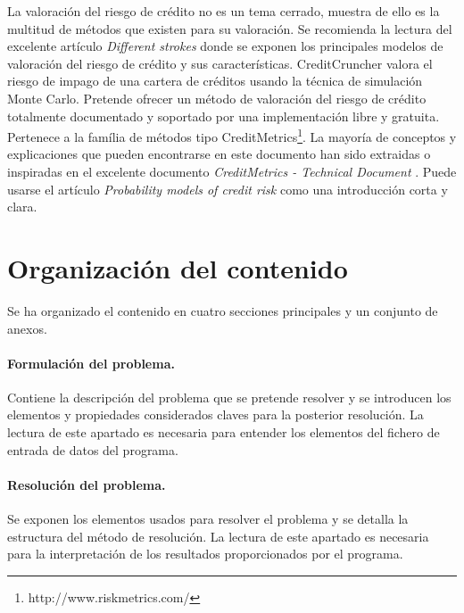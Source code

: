 La valoraci\'on del riesgo de cr\'edito no es un tema cerrado, muestra de ello 
es la multitud de m\'etodos que existen para su valoraci\'on. Se recomienda la 
lectura del excelente art\'iculo \emph{Different strokes} \cite{Risk:Dif_Str} 
donde se exponen los principales modelos de valoraci\'on del riesgo de cr\'edito 
y sus caracter\'isticas. 
\newline
\newline
CreditCruncher valora el riesgo de impago de una cartera de cr\'editos usando la 
t\'ecnica de simulaci\'on Monte Carlo. Pretende ofrecer un m\'etodo de valoraci\'on 
del riesgo de cr\'edito totalmente documentado y soportado por una implementaci\'on 
libre y gratuita. Pertenece a la fam\'ilia de m\'etodos tipo 
CreditMetrics\footnote{http://www.riskmetrics.com/}.
\newline
\newline
La mayor\'ia de conceptos y explicaciones que pueden 
encontrarse en este documento han sido extraidas o inspiradas en el excelente 
documento \emph{CreditMetrics - Technical Document} \cite{CreditMetrics:Tech_Doc}.
Puede usarse el art\'iculo \emph{Probability models of credit risk} \cite{cbs:glasser} 
como una introducci\'on corta y clara.


\section{Organizaci\'on del contenido}

Se ha organizado el contenido en cuatro secciones principales y un conjunto de 
anexos.

\paragraph{Formulaci\'on del problema.} Contiene la descripci\'on del problema
que se pretende resolver y se introducen los elementos y propiedades considerados 
claves para la posterior resoluci\'on. La lectura de este apartado es necesaria para
entender los elementos del fichero de entrada de datos del programa.

\paragraph{Resoluci\'on del problema.} Se exponen los elementos usados para 
resolver el problema y se detalla la estructura del m\'etodo de resoluci\'on.
La lectura de este apartado es necesaria para la interpretaci\'on de los 
resultados proporcionados por el programa.

